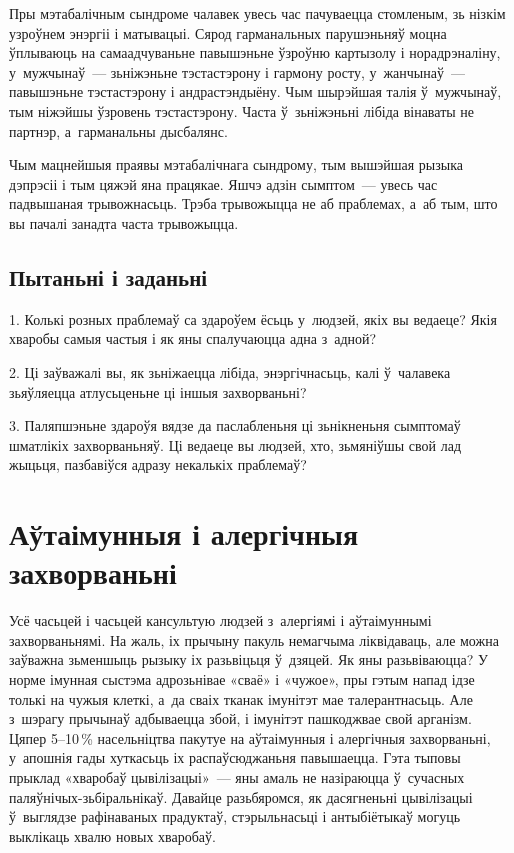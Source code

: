 Пры мэтабалічным сындроме чалавек увесь час пачуваецца стомленым, зь нізкім узроўнем энэргіі і матывацыі. Сярод гарманальных парушэньняў моцна ўплываюць на самаадчуваньне павышэньне ўзроўню картызолу і норадрэналіну, у~мужчынаў~--- зьніжэньне тэстастэрону і гармону росту, у~жанчынаў~--- павышэньне тэстастэрону і андрастэндыёну. Чым шырэйшая талія ў~мужчынаў, тым ніжэйшы ўзровень тэстастэрону. Часта ў~зьніжэньні лібіда вінаваты не партнэр, а~гарманальны дысбалянс.


Чым мацнейшыя праявы мэтабалічнага сындрому, тым вышэйшая рызыка дэпрэсіі і тым цяжэй яна працякае. Яшчэ адзін сымптом~--- увесь час падвышаная трывожнасьць. Трэба трывожыцца не аб праблемах, а~аб тым, што вы пачалі занадта часта трывожыцца.

\subsection*{Пытаньні і заданьні}

1. Колькі розных праблемаў са здароўем ёсьць у~людзей, якіх вы ведаеце? Якія хваробы самыя частыя і як яны спалучаюцца адна з~адной?

2. Ці заўважалі вы, як зьніжаецца лібіда, энэргічнасьць, калі ў~чалавека зьяўляецца атлусьценьне ці іншыя захворваньні?

3. Паляпшэньне здароўя вядзе да паслабленьня ці зьнікненьня сымптомаў шматлікіх захворваньняў. Ці ведаеце вы людзей, хто, зьмяніўшы свой лад жыцьця, пазбавіўся адразу некалькіх праблемаў?


\section{Аўтаімунныя і алергічныя захворваньні}

Усё часьцей і часьцей кансультую людзей з~алергіямі і аўтаімуннымі захворваньнямі. На жаль, іх прычыну пакуль немагчыма ліквідаваць, але можна заўважна зьменшыць рызыку іх разьвіцьця ў~дзяцей. Як яны разьвіваюцца? У норме імунная сыстэма адрозьнівае «сваё» і «чужое», пры гэтым напад ідзе толькі на чужыя клеткі, а~да сваіх тканак імунітэт мае талерантнасьць. Але з~шэрагу прычынаў адбываецца збой, і імунітэт пашкоджвае свой арганізм. Цяпер 5--10\,\% насельніцтва пакутуе на аўтаімунныя і алергічныя захворваньні, у~апошнія гады хуткасьць іх распаўсюджаньня павышаецца. Гэта тыповы прыклад «хваробаў цывілізацыі»~--- яны амаль не назіраюцца ў~сучасных паляўнічых-зьбіральнікаў. Давайце разьбяромся, як дасягненьні цывілізацыі ў~выглядзе рафінаваных прадуктаў, стэрыльнасьці і антыбіётыкаў могуць выклікаць хвалю новых хваробаў.

